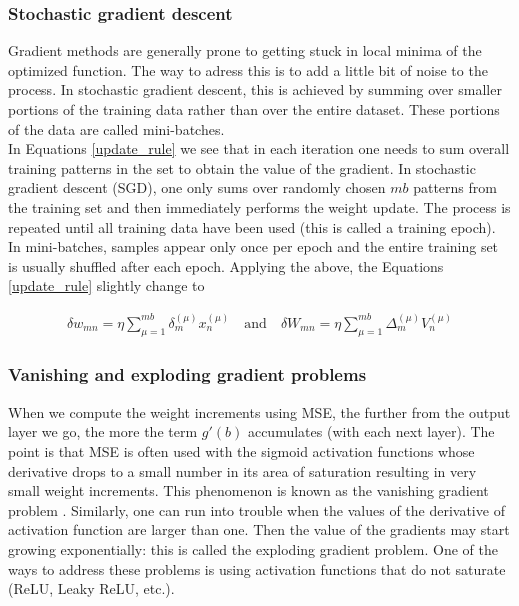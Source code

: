 \subsubsection{Stochastic gradient descent}

Gradient methods are generally prone to getting stuck in local minima of the optimized function. The way to adress this is to add a little bit of noise to the process. In stochastic gradient descent, this is achieved by summing over smaller portions of the training data rather than over the entire dataset. These portions of the data are called mini-batches. \cite{mehlig} \\

In Equations \ref{update_rule} we see that in each iteration one needs to sum overall training patterns in the set to obtain the value of the gradient. In stochastic gradient descent (SGD), one only sums over randomly chosen $ mb $ patterns from the training set and then immediately performs the weight update. The process is repeated until all training data have been used (this is called a training epoch). In mini-batches, samples appear only once per epoch and the entire training set is usually shuffled after each epoch. \cite{mehlig} Applying the above, the Equations \ref{update_rule} slightly change to \cite{mehlig}

\begin{gather}
\delta w_{mn} = \eta \sum\limits_{\mu=1}^{mb} \delta_{m}^{(\mu)} x_{n}^{(\mu)}
\quad \text{and} \quad 
\delta W_{mn} = \eta \sum\limits_{\mu=1}^{mb} \Delta_{m}^{(\mu)} V_{n}^{(\mu)}	
\end{gather}

\subsubsection{Vanishing and exploding gradient problems}

When we compute the weight increments using MSE, the further from the output layer we go, the more the term $ g'(b) $ accumulates (with each next layer). The point is that MSE is often used with the sigmoid activation functions whose derivative drops to a small number in its area of saturation resulting in very small weight increments. This phenomenon is known as the vanishing gradient problem \cite{mehlig}. Similarly, one can run into trouble when the values of the derivative of activation function are larger than one. Then the value of the gradients may start growing exponentially: this is called the exploding gradient problem. \cite{eniola} One of the ways to address these problems is using activation functions that do not saturate (ReLU, Leaky ReLU, etc.). \cite{mehlig} \cite{stanford-L4}

